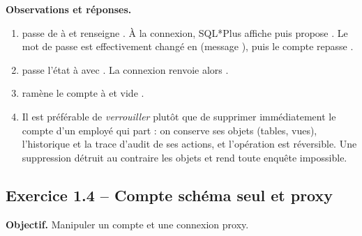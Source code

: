 \textbf{Observations et réponses.}
\begin{enumerate}
  \item {} passe  de  à
         et renseigne . À la connexion, SQL*Plus affiche
         puis propose
        . Le mot de passe est
        effectivement changé en  (message ), puis le compte repasse
        .
  \item {} passe l'état à  avec
        . La connexion renvoie alors .
  \item {} ramène le compte à  et vide .
  \item Il est préférable de \emph{verrouiller} plutôt que de supprimer immédiatement le compte d'un
        employé qui part : on conserve ses objets (tables, vues), l'historique et la trace d'audit de ses
        actions, et l'opération est réversible. Une suppression  détruit au
        contraire les objets et rend toute enquête impossible.
\end{enumerate}

\subsection{Exercice 1.4 -- Compte schéma seul et proxy}
\textbf{Objectif.} Manipuler un compte  et une connexion proxy.


